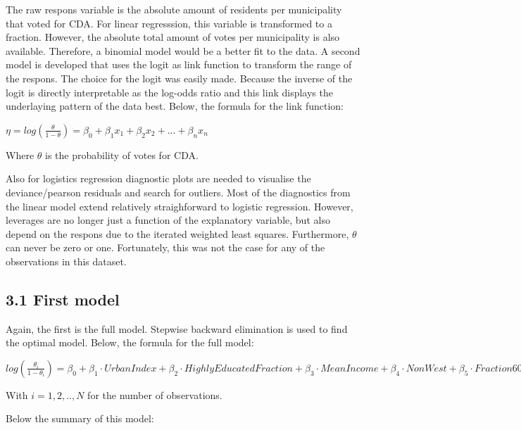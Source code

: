 \documentclass[11pt,]{article}
\begin{document}
The raw respons variable is the absolute amount of residents per
municipality that voted for CDA. For linear regresssion, this variable
is transformed to a fraction. However, the absolute total amount of
votes per municipality is also available. Therefore, a binomial model
would be a better fit to the data. A second model is developed that uses
the logit as link function to transform the range of the respons. The
choice for the logit was easily made. Because the inverse of the logit
is directly interpretable as the log-odds ratio and this link displays
the underlaying pattern of the data best. Below, the formula for the
link function:

\(\eta = log(\frac{\theta}{1 - \theta}) = \beta_0 + \beta_1 x_1 + \beta_2 x_2 + ... + \beta_n x_n\)

Where \(\theta\) is the probability of votes for CDA.

Also for logistics regression diagnostic plots are needed to visualise
the deviance/pearson residuals and search for outliers. Most of the
diagnostics from the linear model extend relatively straighforward to
logistic regression. However, leverages are no longer just a function of
the explanatory variable, but also depend on the respons due to the
iterated weighted least squares. Furthermore, \(\theta\) can never be
zero or one. Fortunately, this was not the case for any of the
observations in this dataset.

\subsection{3.1 First model}\label{first-model-1}

Again, the first is the full model. Stepwise backward elimination is
used to find the optimal model. Below, the formula for the full model:

\(log(\frac{\theta_i}{1 - \theta_i}) = \beta_0 + \beta_1 \cdot UrbanIndex + \beta_2 \cdot HighlyEducatedFraction + \beta_3 \cdot MeanIncome + \beta_4 \cdot NonWest + \beta_5 \cdot Fraction60Plus + \epsilon_i\)

With \(i = 1, 2,.., N\) for the number of observations.

Below the summary of this model:
\end{document}
